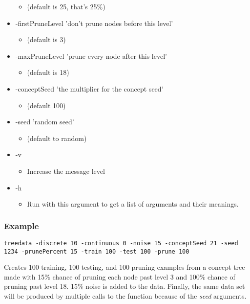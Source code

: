\begin{itemize}
\begin{itemize}
\item (default is 25, that's 25\%)\end{itemize}
\item -first\-Prune\-Level 'don't prune nodes before this level'\begin{itemize}
\item (default is 3)\end{itemize}
\item -max\-Prune\-Level 'prune every node after this level'\begin{itemize}
\item (default is 18)\end{itemize}
\item -concept\-Seed 'the multiplier for the concept seed'\begin{itemize}
\item (default 100)\end{itemize}
\item -seed 'random seed'\begin{itemize}
\item (default to random)\end{itemize}
\item -v\begin{itemize}
\item Increase the message level\end{itemize}
\item -h\begin{itemize}
\item Run with this argument to get a list of arguments and their meanings.\end{itemize}
\end{itemize}


\subsubsection*{Example}

{\tt }

{\tt treedata -discrete 10 -continuous 0 -noise 15 -concept\-Seed 21 -seed 1234 -prune\-Percent 15 -train 100 -test 100 -prune 100}

Creates 100 training, 100 testing, and 100 pruning examples from a concept tree made with 15\% chance of pruning each node past level 3 and 100\% chance of pruning past level 18. 15\% noise is added to the data. Finally, the same data set will be produced by multiple calls to the function because of the {\em seed\/} arguments.

